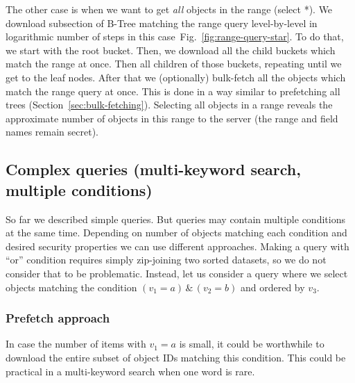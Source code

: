 \documentclass[notitlepage]{revtex4-1}
\newcommand{\figref}[1]{Fig.~\ref{#1}}
\begin{document}
The other case is when we want to get \emph{all} objects in the range (select *).
We download subsection of B-Tree matching the range query level-by-level in logarithmic number of steps in this case~\figref{fig:range-query-star}.
To do that, we start with the root bucket.
Then, we download all the child buckets which match the range at once.
Then all children of those buckets, repeating until we get to the leaf nodes.
After that we (optionally) bulk-fetch all the objects which match the range query at once.
This is done in a way similar to prefetching all trees (Section~\ref{sec:bulk-fetching}).
Selecting all objects in a range reveals the approximate number of objects in this range to the server (the range and field names remain secret).

\subsection{Complex queries (multi-keyword search, multiple conditions)}

So far we described simple queries.
But queries may contain multiple conditions at the same time.
Depending on number of objects matching each condition and desired security properties we can use different approaches.
Making a query with ``or'' condition requires simply zip-joining two sorted datasets, so we do not consider that to be problematic.
Instead, let us consider a query where we select objects matching the condition $(v_1 = a) \,\&\, (v_2 = b)$ and ordered by $v_3$.

\subsubsection{Prefetch approach}
%

In case the number of items with $v_1=a$ is small, it could be worthwhile to download the entire subset of object IDs matching this condition.
This could be practical in a multi-keyword search when one word is rare.
\end{document}
